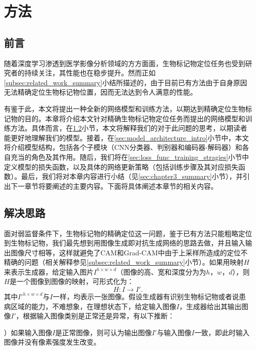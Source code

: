 \chapter{方法}\label{sec:method}
\section{前言}
随着深度学习渗透到医学影像分析领域的方方面面，生物标记物定位任务也受到研究者的持续关注，其性能也在稳步提升。然而正如\ref{subsec:related_work_summary}小结所描述的，由于目前已有方法由于自身原因无法精确定位生物标记物位置，因而无法达到令人满意的性能。

有鉴于此，本文将提出一种全新的网络模型和训练方法，以期达到精确定位生物标记物的目的。本章将介绍本文针对精确生物标记物定位任务而提出的网络模型和训练方法。具体而言，在\ref{sec:idea_thinking}小节，本文将解释我们的对于此问题的思考，以期读者能更好地理解我们的模型。接着，在\ref{sec:model_architecture_intro}小节中，本文将介绍模型结构，包括各个子模块（CNN分类器、判别器和编码器-解码器）和各自充当的角色及其作用。随后，我们将在\ref{sec:loss_func_training_stragies}小节中定义模型的损失函数，以及具体的网络更新策略（包括训练步骤及其对应损失函数）。最后，我们将对本章内容进行小结（见\ref{sec:chapter3_summary}小节），并引出下一章节将要阐述的主要内容。下面将具体阐述本章节的相关内容。
\section{解决思路}\label{sec:idea_thinking}
面对弱监督条件下，生物标记物的精确定位这一问题，鉴于已有方法只能粗略定位到生物标记物，我们最先想到用图像生成即对抗生成网络的思路去做，并且输入输出图像尺寸相等，这样就避免了CAM和Grad-CAM中由于上采样所造成的定位不精确的问题（相关解释参见\ref{subsec:related_work_summary}小节）。如果用映射$H$来表示生成器，给定输入图片$I^{h\times w\times d}$（图像的高、宽和深度分为为$h$，$w$，$d$），则$H$是一个图像到图像的映射，可形式化为：
\begin{equation*}
H: I \to I'.
\end{equation*}
其中$I'^{h\times w\times d}$与$I$一样，均表示一张图像。假设生成器有识别生物标记物或者说患病区域的能力，不难想象，在理想状态下，给定输入图像$I$，生成器给出其输出图像$I'$，根据输入图像类别是正常还是异常，有以下推断：

）如果输入图像$I$是正常图像，则可认为输出图像$I'$与输入图像$I$一致，即此时输入图像并没有像素强度发生改变。

